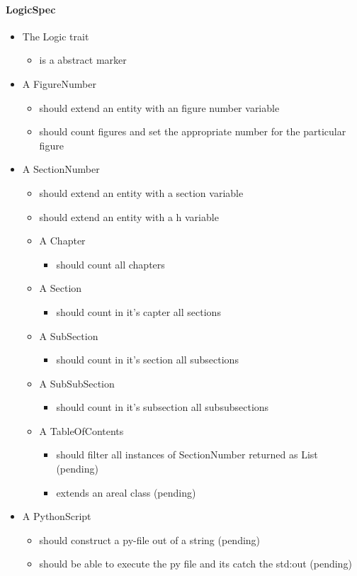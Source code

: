 \paragraph{LogicSpec}

\begin{itemize}
\item The Logic trait
\begin{itemize}
  \item is a abstract marker
\end{itemize}
\item A FigureNumber
\begin{itemize}
  \item should extend an entity with an figure number variable
  \item should count figures and set the appropriate number for the particular figure
\end{itemize}
\item A SectionNumber
\begin{itemize}
  \item should extend an entity with a section variable
  \item should extend an entity with a h variable
  \item A Chapter
  \begin{itemize}
    \item should count all chapters
  \end{itemize}
  \item A Section
  \begin{itemize}
    \item should count in it's capter all sections
  \end{itemize}
  \item A SubSection 
  \begin{itemize}
    \item should count in it's section all subsections
  \end{itemize}
  \item A SubSubSection
  \begin{itemize}
    \item should count in it's subsection all subsubsections
  \end{itemize}
  \item   A TableOfContents 
  \begin{itemize}
    \item should filter all instances of SectionNumber returned as List (pending)
    \item extends an areal class (pending)
  \end{itemize}
\end{itemize}
\item A PythonScript
\begin{itemize}
  \item should construct a py-file out of a string (pending)
  \item should be able to execute the py file and its catch the std:out (pending)
\end{itemize}
\end{itemize}

